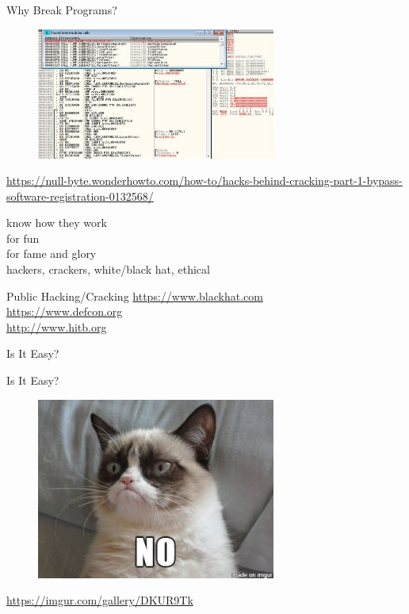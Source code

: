 \documentclass{simple}
\begin{document}
\begin{frame}{Why Break Programs?}
  \centering
  \begin{figure}
    \centering
    \includegraphics[width=0.7\textwidth]{img/software-cracking}
  \end{figure}
  \begin{center}
    \tiny
    \url{https://null-byte.wonderhowto.com/how-to/hacks-behind-cracking-part-1-bypass-software-registration-0132568/}
  \end{center}
  \pause know how they work \\
  \pause for fun \\
  \pause for fame and glory \\
  \pause hackers, crackers, white/black hat, ethical
\end{frame}

\begin{frame}{Public Hacking/Cracking}
  \centering
  \pause \url{https://www.blackhat.com} \\
  \vspace{0.5cm}
  \pause \url{https://www.defcon.org} \\
  \vspace{0.5cm}
  \pause \url{http://www.hitb.org} \\
\end{frame}

\begin{frame}{Is It Easy?}
\end{frame}

\begin{frame}{Is It Easy?}
  \begin{figure}
    \centering
    \includegraphics[width=0.7\textwidth]{img/no}
  \end{figure}
  \begin{center}
    \tiny
    \url{https://imgur.com/gallery/DKUR9Tk}
  \end{center}
\end{frame}
\end{document}
